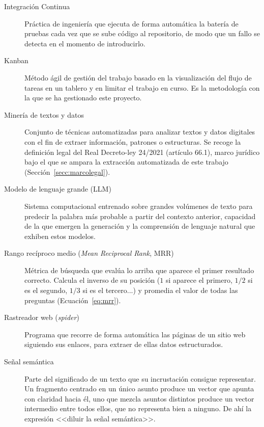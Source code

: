 \begin{description}
  \item[Integración Continua] Práctica de ingeniería que ejecuta de forma
        automática la batería de pruebas cada vez que se sube código al
        repositorio, de modo que un fallo se detecta en el momento de introducirlo.
        
  \item[Kanban] Método ágil de gestión del trabajo basado en la
        visualización del flujo de tareas en un tablero y en limitar el trabajo
        en curso. Es la metodología con la que se ha gestionado este proyecto.
        
    \item[Minería de textos y datos] Conjunto de técnicas 
        automatizadas para analizar textos y datos digitales con el fin de extraer 
        información, patrones o estructuras. Se recoge la definición legal del 
        Real Decreto-ley 24/2021\cite{rdl24_2021} (artículo 66.1), marco jurídico bajo 
        el que se ampara la extracción automatizada de este trabajo (Sección~\ref{secc:marcolegal}).
        
  \item[Modelo de lenguaje grande (LLM)] Sistema computacional entrenado
        sobre grandes volúmenes de texto para predecir la palabra más probable a
        partir del contexto anterior, capacidad de la que emergen la generación y
        la comprensión de lenguaje natural que exhiben estos modelos.
        
    \item[Rango recíproco medio (\textit{Mean Reciprocal Rank}, MRR)] Métrica 
        de búsqueda que evalúa lo arriba que aparece el primer resultado correcto. Calcula el 
        inverso de su posición ($1$ si aparece el primero, $1/2$ si es el segundo, $1/3$ si es el tercero...) 
        y promedia el valor de todas las preguntas (Ecuación~\ref{eq:mrr}).


  \item[Rastreador web (\textit{spider})] Programa que recorre de forma
        automática las páginas de un sitio web siguiendo sus enlaces, para extraer
        de ellas datos estructurados.

  \item[Señal semántica] Parte del significado de un
        texto que su incrustación consigue representar. Un fragmento centrado en un
        único asunto produce un vector que apunta con claridad hacia él, uno que
        mezcla asuntos distintos produce un vector intermedio entre todos ellos, que
        no representa bien a ninguno. De ahí la expresión <<diluir la señal
        semántica>>.
        

\end{description}
